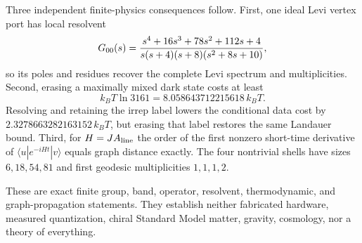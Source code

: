 Three independent finite-physics consequences follow.  First, one ideal
Levi vertex port has local resolvent
\[
G_{00}(s)={s^4+16s^3+78s^2+112s+4\over
s(s+4)(s+8)(s^2+8s+10)},
\]
so its poles and residues recover the complete Levi spectrum and
multiplicities.  Second, erasing a maximally mixed dark state costs at
least
\[
k_BT\ln3161=8.058643712215618\,k_BT.
\]
Resolving and retaining the irrep label lowers the conditional data cost
by $2.3278663282163152\,k_BT$, but erasing that label restores the same
Landauer bound.  Third, for $H=JA_{\rm line}$ the order of the first
nonzero short-time derivative of
$\langle u|e^{-iHt}|v\rangle$ equals graph distance exactly.  The four
nontrivial shells have sizes $6,18,54,81$ and first geodesic
multiplicities $1,1,1,2$.

These are exact finite group, band, operator, resolvent, thermodynamic,
and graph-propagation statements.  They establish neither fabricated
hardware, measured quantization, chiral Standard Model matter, gravity,
cosmology, nor a theory of everything.
